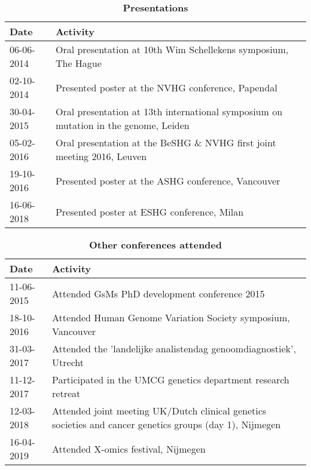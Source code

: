 \begin{appendices}
\begin{table}
	\caption*{\textbf{Presentations}}
	\footnotesize
	\begin{tabulary}{\linewidth}{LL}
		Date & Activity \\
		\hline
			\rule{0pt}{2.6ex}\mbox{06-06-2014} & Oral presentation at 10th Wim Schellekens symposium, The Hague \\
			\rule{0pt}{2.6ex}\mbox{02-10-2014} & Presented poster at the NVHG conference, Papendal \\
			\rule{0pt}{2.6ex}\mbox{30-04-2015} & Oral presentation at 13th international symposium on mutation in the genome, Leiden \\
			\rule{0pt}{2.6ex}\mbox{05-02-2016} & Oral presentation at the BeSHG \& NVHG first joint meeting 2016, Leuven \\
			\rule{0pt}{2.6ex}\mbox{19-10-2016} & Presented poster at the ASHG conference, Vancouver\\
			\rule{0pt}{2.6ex}\mbox{16-06-2018} & Presented poster at ESHG conference, Milan \\
			\hline
\end{tabulary}
\label{table:appendix_activities_2}
\end{table}

\clearpage

\begin{table}
	\caption*{\textbf{Other conferences attended}}
	\footnotesize
	\begin{tabulary}{\linewidth}{LL}
		Date & Activity \\
		\hline
			\rule{0pt}{2.6ex}\mbox{11-06-2015} & Attended GsMs PhD development conference 2015\\
			\rule{0pt}{2.6ex}\mbox{18-10-2016} & Attended Human Genome Variation Society symposium, Vancouver\\
			\rule{0pt}{2.6ex}\mbox{31-03-2017} & Attended the 'landelijke analistendag genoomdiagnostiek', Utrecht \\
			\rule{0pt}{2.6ex}\mbox{11-12-2017} & Participated in the UMCG genetics department research retreat\\
			\rule{0pt}{2.6ex}\mbox{12-03-2018} & Attended joint meeting UK/Dutch clinical genetics societies and cancer genetics groups (day 1), Nijmegen\\
			\rule{0pt}{2.6ex}\mbox{16-04-2019} & Attended X-omics festival, Nijmegen \\
				\hline
\end{tabulary}
\label{table:appendix_activities_3}
\end{table}		
			


\end{appendices}
